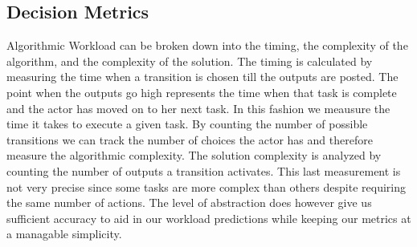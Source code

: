 \subsection{Decision Metrics}
Algorithmic Workload can be broken down into the timing, the complexity of the algorithm, and the complexity of the solution. The timing is calculated by measuring the time when a transition is chosen till the outputs are posted. The point when the outputs go high represents the time when that task is complete and the actor has moved on to her next task. In this fashion we meausure the time it takes to execute a given task. By counting the number of possible transitions we can track the number of choices the actor has and therefore measure the algorithmic complexity. The solution complexity is analyzed by counting the number of outputs a transition activates. This last measurement is not very precise since some tasks are more complex than others despite requiring the same number of actions. The level of abstraction does however give us sufficient accuracy to aid in our workload predictions while keeping our metrics at a managable simplicity.